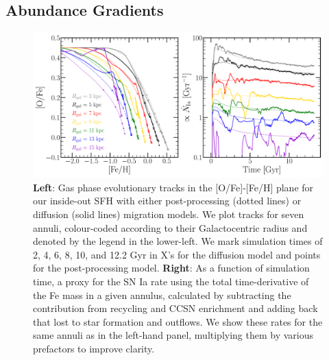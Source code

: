 \documentclass[fleqn, usenatbib]{mnras}
\begin{document}
\subsection{Abundance Gradients} 
\label{sec:obs_comp:gradient} 

\begin{figure} 
\centering 
\includegraphics[scale = 0.42]{tracks.pdf} 
\caption{\textbf{Left}: Gas phase evolutionary tracks in the [O/Fe]-[Fe/H] 
plane for our inside-out SFH with either post-processing (dotted lines) or 
diffusion (solid lines) migration models. We plot tracks for seven annuli, 
colour-coded according to their Galactocentric radius and denoted by the 
legend in the lower-left. We mark simulation times of 2, 4, 6, 8, 10, and 12.2 
Gyr in X's for the diffusion model and points for the post-processing model. 
\textbf{Right}: As a function of simulation time, a proxy for the SN Ia rate 
using the total time-derivative of the Fe mass in a given annulus, calculated 
by subtracting the contribution from recycling and CCSN enrichment and adding 
back that lost to star formation and outflows. We show these rates for the 
same annuli as in the left-hand panel, multiplying them by various prefactors 
to improve clarity. } 
\label{fig:tracks} 
\end{figure} 
\end{document}
